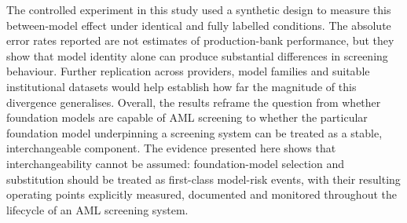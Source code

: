 \documentclass[pdflatex,sn-basic,Numbered]{sn-jnl}
\begin{document}
The controlled experiment in this study used a synthetic design to measure this between-model effect under identical and fully labelled conditions. The absolute error rates reported are not estimates of production-bank performance, but they show that model identity alone can produce substantial differences in screening behaviour. Further replication across providers, model families and suitable institutional datasets would help establish how far the magnitude of this divergence generalises. Overall, the results reframe the question from whether foundation models are capable of AML screening to whether the particular foundation model underpinning a screening system can be treated as a stable, interchangeable component. The evidence presented here shows that interchangeability cannot be assumed: foundation-model selection and substitution should be treated as first-class model-risk events, with their resulting operating points explicitly measured, documented and monitored throughout the lifecycle of an AML screening system.
\end{document}
